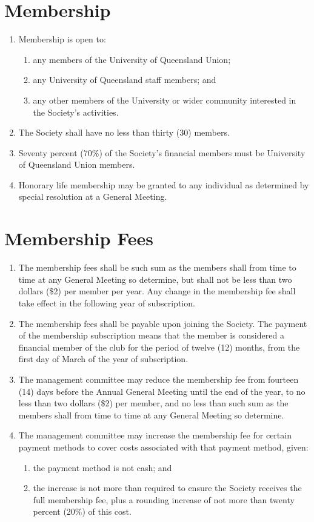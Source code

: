 \documentclass[a4paper]{article}
\newcommand*{\sectionr}[1]{{\raggedright \section{#1}}}
\begin{document}
\sectionr{Membership}
\begin{enumerate}
\item Membership is open to:
	\begin{enumerate}
	\item any members of the University of Queensland Union;
	\item any University of Queensland staff members; and
	\item any other members of the University or wider community interested in the Society's activities.
	\end{enumerate}
\item The Society shall have no less than thirty (30) members.
\item Seventy percent (70\%) of the Society's financial members must be University of Queensland Union members.
\item Honorary life membership may be granted to any individual as determined by special resolution at a General Meeting.
\end{enumerate}

\sectionr{Membership Fees}
\begin{enumerate}
\item The membership fees shall be such sum as the members shall from time to time at any General Meeting so determine, but shall not be less than two dollars (\$2) per member per year. Any change in the membership fee shall take effect in the following year of subscription.
\item The membership fees shall be payable upon joining the Society. The payment of the membership subscription means that the member is considered a financial member of the club for the period of twelve (12) months, from the first day of March of the year of subscription.
\item The management committee may reduce the membership fee from fourteen (14) days before the Annual General Meeting until the end of the year, to no less than two dollars (\$2) per member, and no less than such sum as the members shall from time to time at any General Meeting so determine.
\item The management committee may increase the membership fee for certain payment methods to cover costs associated with that payment method, given:
	\begin{enumerate}
	\item the payment method is not cash; and
	\item the increase is not more than required to ensure the Society receives the full membership fee, plus a rounding increase of not more than twenty percent (20\%) of this cost.
	\end{enumerate}
\end{enumerate}
\end{document}

